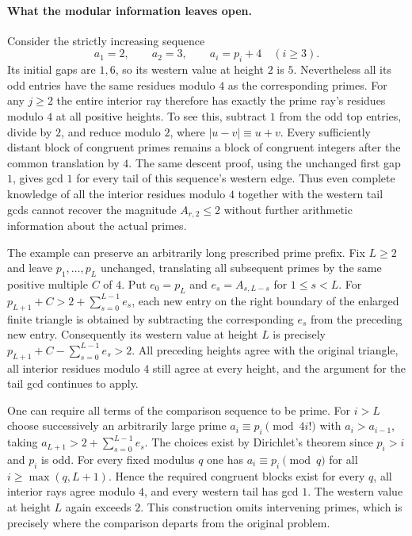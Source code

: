 \documentclass[11pt,a4paper]{article}
\begin{document}
\paragraph{What the modular information leaves open.}
Consider the strictly increasing sequence
\[
           a_1=2,\qquad a_2=3,\qquad a_i=p_i+4\quad(i\ge3).
\]
Its initial gaps are $1,6$, so its western value at height $2$ is $5$.
Nevertheless all its odd entries have the same residues modulo $4$
as the corresponding primes. For any $j\ge2$ the entire interior ray
therefore has exactly the prime ray's residues modulo $4$ at all positive
heights. To see this, subtract $1$ from the odd top entries, divide
by $2$, and reduce modulo $2$, where $|u-v|\equiv u+v$.
Every sufficiently distant block of congruent primes remains a block of
congruent integers after the common translation by $4$.
The same descent proof, using the unchanged first gap $1$, gives gcd
$1$ for every tail of this sequence's western edge. Thus even complete
knowledge of all the interior residues modulo $4$ together with the
western tail gcds cannot recover the magnitude $A_{r,2}\le2$ without
further arithmetic information about the actual primes.

The example can preserve an arbitrarily long prescribed prime prefix.
Fix $L\ge2$ and leave $p_1,\ldots,p_L$ unchanged, translating all
subsequent primes by the same positive multiple $C$ of $4$. Put
$e_0=p_L$ and $e_s=A_{s,L-s}$ for $1\le s<L$.
For $p_{L+1}+C>2+\sum_{s=0}^{L-1}e_s$, each new entry on the
right boundary of the enlarged finite triangle is obtained by
subtracting the corresponding $e_s$ from the preceding new entry.
Consequently its western value at height $L$ is precisely
$p_{L+1}+C-\sum_{s=0}^{L-1}e_s>2$.
All preceding heights agree with the original triangle, all interior
residues modulo $4$ still agree at every height, and the argument
for the tail gcd continues to apply.

One can require all terms of the comparison sequence to be prime.
For $i>L$ choose successively an arbitrarily large prime
$a_i\equiv p_i\pmod{4i!}$ with $a_i>a_{i-1}$, taking
$a_{L+1}>2+\sum_{s=0}^{L-1}e_s$. The choices exist by Dirichlet's
theorem since $p_i>i$ and $p_i$ is odd. For every fixed modulus
$q$ one has $a_i\equiv p_i\pmod q$ for all $i\ge\max(q,L+1)$.
Hence the required congruent blocks exist for every $q$, all interior
rays agree modulo $4$, and every western tail has gcd $1$. The western
value at height $L$ again exceeds $2$. This construction omits intervening
primes, which is precisely where the comparison departs from the original
problem.
\end{document}
